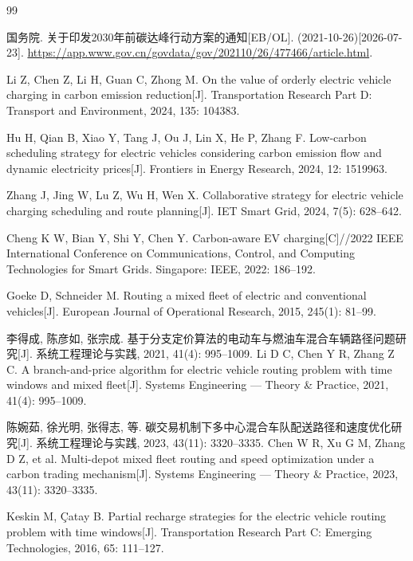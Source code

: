 \documentclass{setp-new}
\begin{document}
\begin{thebibliography}{99}

 国务院. 关于印发2030年前碳达峰行动方案的通知[EB/OL]. (2021-10-26)[2026-07-23].
\url{https://app.www.gov.cn/govdata/gov/202110/26/477466/article.html}.

 Li Z, Chen Z, Li H, Guan C, Zhong M. On the value of orderly electric vehicle charging in carbon emission reduction[J]. Transportation Research Part D: Transport and Environment, 2024, 135: 104383.

 Hu H, Qian B, Xiao Y, Tang J, Ou J, Lin X, He P, Zhang F. Low-carbon scheduling strategy for electric vehicles considering carbon emission flow and dynamic electricity prices[J]. Frontiers in Energy Research, 2024, 12: 1519963.

 Zhang J, Jing W, Lu Z, Wu H, Wen X. Collaborative strategy for electric vehicle charging scheduling and route planning[J]. IET Smart Grid, 2024, 7(5): 628--642.

 Cheng K W, Bian Y, Shi Y, Chen Y. Carbon-aware EV charging[C]//2022 IEEE International Conference on Communications, Control, and Computing Technologies for Smart Grids. Singapore: IEEE, 2022: 186--192.

 Goeke D, Schneider M. Routing a mixed fleet of electric and conventional vehicles[J]. European Journal of Operational Research, 2015, 245(1): 81--99.

 李得成, 陈彦如, 张宗成. 基于分支定价算法的电动车与燃油车混合车辆路径问题研究[J]. 系统工程理论与实践, 2021, 41(4): 995--1009.\newline
Li D C, Chen Y R, Zhang Z C. A branch-and-price algorithm for electric vehicle routing problem with time windows and mixed fleet[J]. Systems Engineering --- Theory \& Practice, 2021, 41(4): 995--1009.

 陈婉茹, 徐光明, 张得志, 等. 碳交易机制下多中心混合车队配送路径和速度优化研究[J]. 系统工程理论与实践, 2023, 43(11): 3320--3335.\newline
Chen W R, Xu G M, Zhang D Z, et al. Multi-depot mixed fleet routing and speed optimization under a carbon trading mechanism[J]. Systems Engineering --- Theory \& Practice, 2023, 43(11): 3320--3335.

 Keskin M, \c{C}atay B. Partial recharge strategies for the electric vehicle routing problem with time windows[J]. Transportation Research Part C: Emerging Technologies, 2016, 65: 111--127.


\end{thebibliography}
\end{document}
